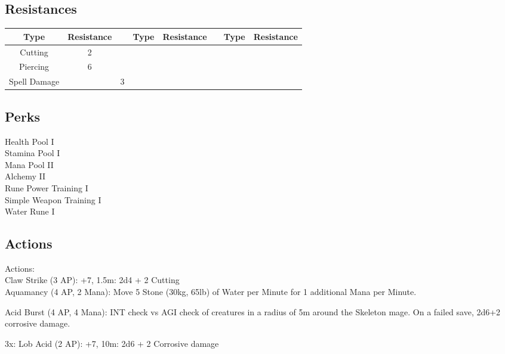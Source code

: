 \subsection{Resistances}
\begin{minipage}[H]{1\textwidth}
    \centering
    \begin{tabular}[c]{|c | c | c | c | c | c | c | c|}
        \hline
        Type & Resistance && Type & Resistance && Type & Resistance\\
        \hline
        Cutting & 2 \\
        Piercing & 6\\
        Spell Damage && 3\\
        \hline
    \end{tabular}
\end{minipage}

\subsection{Perks}
Health Pool I\\
Stamina Pool I\\
Mana Pool II\\
Alchemy II\\
Rune Power Training I\\
Simple Weapon Training I\\
Water Rune I\\

\subsection{Actions}
Actions:\\
Claw Strike (3 AP): +7, 1.5m: 2d4 + 2 Cutting\\

Aquamancy (4 AP, 2 Mana): Move 5 Stone (30kg, 65lb) of Water per Minute for 1 additional Mana per Minute.

Acid Burst (4 AP, 4 Mana): INT check vs AGI check of creatures in a radius of 5m around the Skeleton mage.
On a failed save, 2d6+2 corrosive damage.

3x: Lob Acid (2 AP): +7, 10m: 2d6 + 2 Corrosive damage\\

